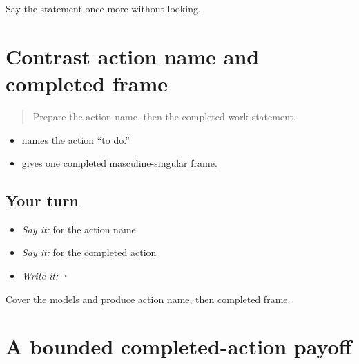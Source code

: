 \begin{tcolorbox}[breakable,colback=teal!4,colframe=teal!35!black,title={Before you move on}]
Say the statement once more without looking.
\end{tcolorbox}
\section[\texorpdfstring{\pa{ਕਰਨਾ} · \pa{ਮੈਂ} \pa{ਕੰਮ} \pa{ਕੀਤਾ} (karnaa; main …)}{ਕਰਨਾ · ਮੈਂ ਕੰਮ ਕੀਤਾ (karnaa; main …)}]{Contrast action name and completed frame}

\label{lesson:PA-C190-infinitive-perfective-contrast}



\begin{quote}
Prepare the action name, then the completed work statement.
\end{quote}

\begin{grammarlens}[title={Grammar Lens: infinitive versus completed action}]
\begin{itemize}
\raggedright
  \item \textbf{} names the action “to do.”
  \item \textbf{  } gives one completed masculine-singular frame.
\end{itemize}
\end{grammarlens}

\subsection*{Your turn}
\begin{itemize}
\raggedright
  \item \emph{Say it:} \textbf{} for the action name
  \item \emph{Say it:} \textbf{  } for the completed action
  \item \emph{Write it:} \textbf{ · }
\end{itemize}

\begin{tcolorbox}[breakable,colback=teal!4,colframe=teal!35!black,title={Before you move on}]
Cover the models and produce action name, then completed frame.
\end{tcolorbox}
\section[\texorpdfstring{\pa{ਕਰਨਾ} · \pa{ਮੈਂ} \pa{ਕੰਮ} \pa{ਕੀਤਾ} (karnaa; main …)}{ਕਰਨਾ · ਮੈਂ ਕੰਮ ਕੀਤਾ (karnaa; main …)}]{A bounded completed-action payoff}

